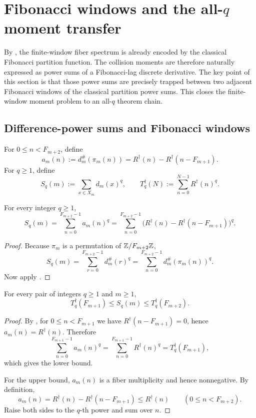\section{Fibonacci windows and the all-\texorpdfstring{$q$}{q} moment transfer}
\label{sec:second-collision}

By , the finite-window fiber spectrum is already
encoded by the classical Fibonacci partition function.  The collision moments
are therefore naturally expressed as power sums of a Fibonacci-lag discrete
derivative.  The key point of this section is that those power sums are
precisely trapped between two adjacent Fibonacci windows of the classical
partition power sums.  This closes the finite-window moment problem to an
all-\(q\) theorem chain.

\subsection{Difference-power sums and Fibonacci windows}

\begin{definition}
\label{def:difference-spectrum}
For \(0\le n<F_{m+2}\), define
\[
  a_m(n):=d_m^\#(\pi_m(n))
  =
  R^\dagger(n)-R^\dagger(n-F_{m+1}).
\]
For \(q\ge 1\), define
\[
  S_q(m):=\sum_{x\in X_m} d_m(x)^q,
  \qquad
  T_q^\dagger(N):=\sum_{n=0}^{N-1} R^\dagger(n)^q.
\]
\end{definition}

\begin{theorem}
\label{thm:difference-power-sums}
For every integer \(q\ge 1\),
\[
  S_q(m)
  =
  \sum_{n=0}^{F_{m+2}-1} a_m(n)^q
  =
  \sum_{n=0}^{F_{m+2}-1}
  \bigl(R^\dagger(n)-R^\dagger(n-F_{m+1})\bigr)^q.
\]
\end{theorem}

\begin{proof}
Because \(\pi_m\) is a permutation of \(\mathbb{Z}/F_{m+2}\mathbb{Z}\),
\[
  S_q(m)
  =
  \sum_{r=0}^{F_{m+2}-1} d_m^\#(r)^q
  =
  \sum_{n=0}^{F_{m+2}-1} d_m^\#(\pi_m(n))^q.
\]
Now apply .
\end{proof}

\begin{theorem}
\label{thm:fibonacci-window-sandwich}
For every pair of integers \(q\ge 1\) and \(m\ge 1\),
\[
  T_q^\dagger(F_{m+1})\le S_q(m)\le T_q^\dagger(F_{m+2}).
\]
\end{theorem}

\begin{proof}
By , for \(0\le n<F_{m+1}\) we have
\(R^\dagger(n-F_{m+1})=0\), hence \(a_m(n)=R^\dagger(n)\).  Therefore
\[
  \sum_{n=0}^{F_{m+1}-1} a_m(n)^q
  =
  \sum_{n=0}^{F_{m+1}-1} R^\dagger(n)^q
  =
  T_q^\dagger(F_{m+1}),
\]
which gives the lower bound.

For the upper bound, \(a_m(n)\) is a fiber multiplicity and hence nonnegative.
By definition,
\[
  a_m(n)=R^\dagger(n)-R^\dagger(n-F_{m+1})\le R^\dagger(n)
  \qquad (0\le n<F_{m+2}).
\]
Raise both sides to the \(q\)-th power and sum over \(n\).
\end{proof}

